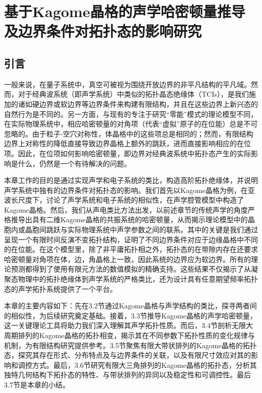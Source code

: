 \chapter{基于Kagome晶格的声学哈密顿量推导及边界条件对拓扑态的影响研究}

\section{引言}

一般来说，在量子系统中，真空可被视为围绕开放边界的非平凡结构的平凡域。然而，对于经典波系统（即声学系统）中类似的拓扑晶态绝缘体（TCIs），是我们施加的诸如硬边界或软边界等边界条件来构建有限结构，并且在这些边界上新兴态的自然行为是不同的。另一方面，与现有的专注于研究“零能”模式的理论模型不同，在实际物理系统中，相应哈密顿量的对角项（代表“虚拟”原子的在位能）总是不可忽略的。由于粒子-空穴对称性，体晶格中的这些项总是相同的；然而，有限结构边界上对称性的降低直接导致边界晶格上额外的跳跃，进而直接影响相应的在位项。因此，在位项如何影响哈密顿量，即边界对经典波系统中拓扑态产生的实际影响是什么，仍然是一个有待解决的问题。

本章工作的目的是通过实现声学和电子系统的类比，构造高阶拓扑绝缘体，并说明声学系统中独有的边界条件对拓扑态的影响。我们首先以Kagome晶格为例，在亚波长尺度下，讨论了声学系统和电子系统的相似性，在声学腔管模型中构造了Kagome晶格。然后，我们从声电类比方法出发，以前述章节的传统声学的角度严格推导出具有二维Kagome晶格的共振系统的哈密顿量，从而揭示理论模型中的晶胞内或晶胞间跳跃与实际物理系统中声学参数之间的联系。其中的关键是我们通过呈现一个有限时间反演不变拓扑结构，证明了不同边界条件对应于边缘晶格中不同的在位能。在这个模型里，除了非平庸拓扑相之外，拓扑态的在带隙内存在还要求哈密顿量对角项在体，边，角晶格上一致，因此系统的边界应为软边界。所有的理论预测都得到了使用有限元方法的数值模拟的精确支持。这些结果不仅揭示了从凝聚态物理中的拓扑绝缘体到声学系统的严格类比，还为设计具有任意期望频率拓扑态的声学拓扑系统提供了一个平台。

本章的主要内容如下：先在3.2节通过Kagome晶格与声学结构的类比，探寻两者间的相似性，为后续研究奠定基础。接着，3.3节推导Kagome晶格的声学哈密顿量，这一关键理论工具将助力我们深入理解其声学拓扑性质。而后，3.4节剖析无限大周期排列的Kagome晶格的拓扑相变，揭示其在不同参数下拓扑性质的变化规律与机制，为有限结构研究提供参考。3.5节聚焦有限大带状排列的Kagome晶格的拓扑态，探究其存在形式、分布特点及与边界条件的关联，以及有限尺寸效应对其的影响和调控方式。最后，3.6节研究有限大三角排列的Kagome晶格的拓扑态，分析其独特几何结构下拓扑态的特性、与带状排列的异同以及稳定性和可调控性。最后3.7节是本章的小结。


